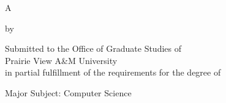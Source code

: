 %
%
%


\begin{titlepage}
\begin{center}

\vspace*{50 pt}
\MakeUppercase{\pvamumanuscripttitle}

\vspace{60 pt}
A \pvamupapertype

by

\MakeUppercase{\pvamufullname}

\vspace{60 pt}

\begin{singlespace}
Submitted to the Office of Graduate Studies of \\
Prairie View A\&M University \\
in partial fulfillment of the requirements for the degree of\\
\end{singlespace}

\vspace{20 pt}
\MakeUppercase{\pvamudegree}

\vspace{60 pt}

\pvamugradmonth \hspace{2pt} \pvamugradyear

\vspace{60 pt}

Major Subject: Computer Science
\par\end{center}

\end{titlepage}
\pagebreak{}




